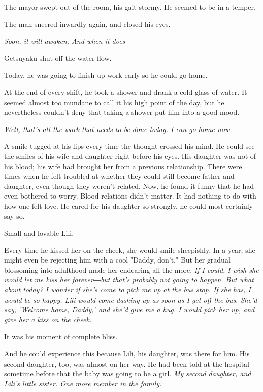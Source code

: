 The mayor swept out of the room, his gait stormy. He seemed to be in a
temper.

The man sneered inwardly again, and closed his eyes.

\emph{Soon, it will awaken. And when it does―}

\myspace

Getsuyaku shut off the water flow.

Today, he was going to finish up work early so he could go home.

At the end of every shift, he took a shower and drank a cold glass of
water. It seemed almost too mundane to call it his high point of the
day, but he nevertheless couldn't deny that taking a shower put him into
a good mood.

\emph{Well, that's all the work that needs to be done today. I can go home
	now.}

A smile tugged at his lips every time the thought crossed his mind. He
could see the smiles of his wife and daughter right before his eyes. His
daughter was not of his blood; his wife had brought her from a previous
relationship. There were times when he felt troubled at whether they
could still become father and daughter, even though they weren't
related. Now, he found it funny that he had even bothered to worry.
Blood relations didn't matter. It had nothing to do with how one felt
love. He cared for his daughter so strongly, he could most certainly say
so.

Small and lovable Lili.

Every time he kissed her on the cheek, she would smile sheepishly. In a
year, she might even be rejecting him with a cool "Daddy, don't." But
her gradual blossoming into adulthood made her endearing all the more.
\emph{If I could, I wish she would let me kiss her forever―but that's probably
	not going to happen. But what about today? I wonder if she's come to
	pick me up at the bus stop. If she has, I would be so happy. Lili would
	come dashing up as soon as I get off the bus. She'd say, 'Welcome home,
	Daddy,' and she'd give me a hug. I would pick her up, and give her a
	kiss on the cheek.}

It was his moment of complete bliss.

And he could experience this because Lili, his daughter, was there for
him. His second daughter, too, was almost on her way. He had been told
at the hospital sometime before that the baby was going to be a girl. \emph{My
	second daughter, and Lili's little sister. One more member in the
	family.}


